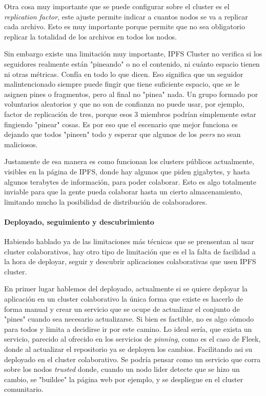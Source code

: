 Otra cosa muy importante que se puede configurar sobre el cluster es el \textit{replication factor}, este ajuste permite indicar a cuantos nodos se va a replicar cada archivo. Esto es muy importante porque permite que no sea obligatorio replicar la totalidad de los archivos en todos los nodos. 

Sin embargo existe una limitación muy importante, IPFS Cluster no verifica si los seguidores realmente están "pineando" o no el contenido, ni cuánto espacio tienen ni otras métricas. Confía en todo lo que dicen. Eso significa que un seguidor malintencionado siempre puede fingir que tiene suficiente espacio, que se le asignen pines o fragmentos, pero al final no "pinea" nada. Un grupo formado por voluntarios aleatorios y que no son de confianza no puede usar, por ejemplo, factor de replicación de tres, porque esos 3 miembros podrían simplemente estar fingiendo "pinear" cosas. Es por eso que el escenario que mejor funciona es dejando que todos "pineen" todo y esperar que algunos de los \textit{peers} no sean maliciosos.

Justamente de esa manera es como funcionan los clusters públicos actualmente, visibles en la página de IPFS\cite{collaborative-clusters}, donde hay algunos que piden gigabytes, y hasta algunos terabytes de información, para poder colaborar. Esto es algo totalmente inviable para que la gente pueda colaborar hasta un cierto almacenamiento, limitando mucho la posibilidad de distribución de colaboradores.

\paragraph{Deployado, seguimiento y descubrimiento}

Habiendo hablado ya de las limitaciones más técnicas que se prensentan al usar cluster colaborativos, hay otro tipo de limitación que es el la falta de facilidad a la hora de deployar, seguir y descubrir aplicaciones colaborativas que usen IPFS cluster.

En primer lugar hablemos del deployado, actualmente si se quiere deployar la aplicación en un cluster colaborativo la única forma que existe es hacerlo de forma manual y crear un servicio que se ocupe de actualizar el conjunto de "pines" cuando sea necesario actualizarse. Si bien es factible, no es algo cómodo para todos y limita a decidirse ir por este camino. Lo ideal sería, que exista un servicio, parecido al ofrecido en los servicios de \textit{pinning}, como es el caso de Fleek\cite{fleek}, donde al actualizar el repositorio ya se deployen los cambios. Facilitando asi su deployado en el cluster colaborativo. Se podría pensar como un servicio que corra sobre los nodos \textit{trusted} donde, cuando un nodo lider detecte que se hizo un cambio, se "buildee" la página web por ejemplo, y se despliegue en el cluster comunitario.

